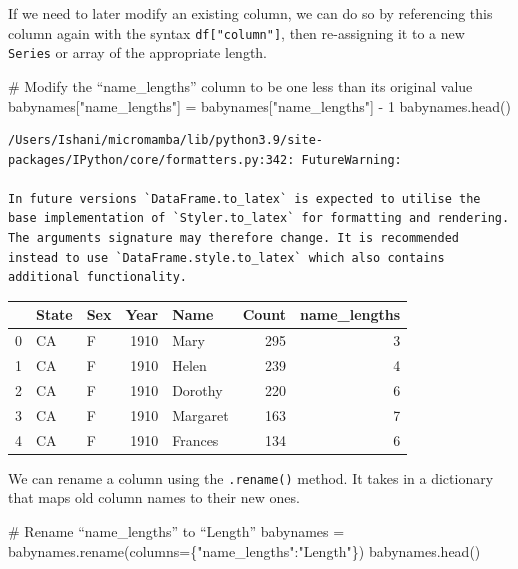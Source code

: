 \documentclass[
  letterpaper,
  DIV=11,
  numbers=noendperiod]{scrreprt}
\newenvironment{Shaded}{\begin{snugshade}}{\end{snugshade}}
\newcommand{\CommentTok}[1]{\textcolor[rgb]{0.37,0.37,0.37}{#1}}
\newcommand{\DecValTok}[1]{\textcolor[rgb]{0.68,0.00,0.00}{#1}}
\newcommand{\NormalTok}[1]{\textcolor[rgb]{0.00,0.23,0.31}{#1}}
\newcommand{\OperatorTok}[1]{\textcolor[rgb]{0.37,0.37,0.37}{#1}}
\newcommand{\StringTok}[1]{\textcolor[rgb]{0.13,0.47,0.30}{#1}}
\begin{document}
If we need to later modify an existing column, we can do so by
referencing this column again with the syntax \texttt{df{[}"column"{]}},
then re-assigning it to a new \texttt{Series} or array of the
appropriate length.

\begin{Shaded}
\begin{Highlighting}[]
\CommentTok{\# Modify the “name\_lengths” column to be one less than its original value}
\NormalTok{babynames[}\StringTok{"name\_lengths"}\NormalTok{] }\OperatorTok{=}\NormalTok{ babynames[}\StringTok{"name\_lengths"}\NormalTok{] }\OperatorTok{{-}} \DecValTok{1}
\NormalTok{babynames.head()}
\end{Highlighting}
\end{Shaded}

\begin{verbatim}
/Users/Ishani/micromamba/lib/python3.9/site-packages/IPython/core/formatters.py:342: FutureWarning:

In future versions `DataFrame.to_latex` is expected to utilise the base implementation of `Styler.to_latex` for formatting and rendering. The arguments signature may therefore change. It is recommended instead to use `DataFrame.style.to_latex` which also contains additional functionality.
\end{verbatim}

\begin{tabular}{lllrlrr}
\toprule
{} & State & Sex &  Year &      Name &  Count &  name\_lengths \\
\midrule
0 &    CA &   F &  1910 &      Mary &    295 &             3 \\
1 &    CA &   F &  1910 &     Helen &    239 &             4 \\
2 &    CA &   F &  1910 &   Dorothy &    220 &             6 \\
3 &    CA &   F &  1910 &  Margaret &    163 &             7 \\
4 &    CA &   F &  1910 &   Frances &    134 &             6 \\
\bottomrule
\end{tabular}

We can rename a column using the \texttt{.rename()} method. It takes in
a dictionary that maps old column names to their new ones.

\begin{Shaded}
\begin{Highlighting}[]
\CommentTok{\# Rename “name\_lengths” to “Length”}
\NormalTok{babynames }\OperatorTok{=}\NormalTok{ babynames.rename(columns}\OperatorTok{=}\NormalTok{\{}\StringTok{"name\_lengths"}\NormalTok{:}\StringTok{"Length"}\NormalTok{\})}
\NormalTok{babynames.head()}
\end{Highlighting}
\end{Shaded}
\end{document}

